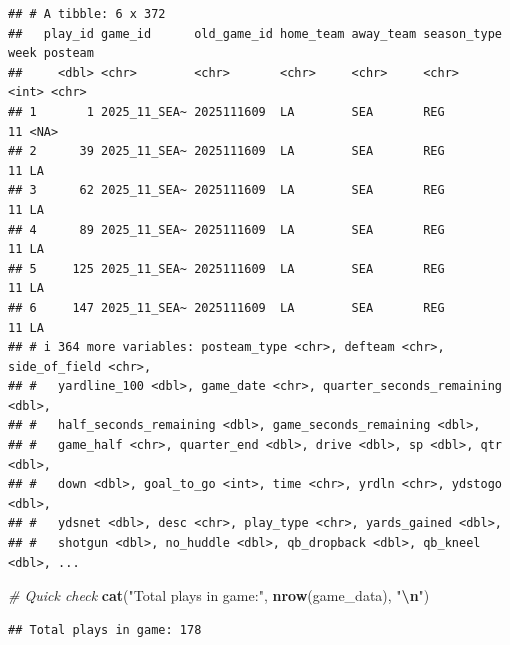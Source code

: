 \documentclass[
]{article}
\newenvironment{Shaded}{\begin{snugshade}}{\end{snugshade}}
\newcommand{\AttributeTok}[1]{\textcolor[rgb]{0.13,0.29,0.53}{#1}}
\newcommand{\CommentTok}[1]{\textcolor[rgb]{0.56,0.35,0.01}{\textit{#1}}}
\newcommand{\ConstantTok}[1]{\textcolor[rgb]{0.56,0.35,0.01}{#1}}
\newcommand{\FunctionTok}[1]{\textcolor[rgb]{0.13,0.29,0.53}{\textbf{#1}}}
\newcommand{\NormalTok}[1]{#1}
\newcommand{\SpecialCharTok}[1]{\textcolor[rgb]{0.81,0.36,0.00}{\textbf{#1}}}
\newcommand{\StringTok}[1]{\textcolor[rgb]{0.31,0.60,0.02}{#1}}
\begin{document}
\begin{verbatim}
## # A tibble: 6 x 372
##   play_id game_id      old_game_id home_team away_team season_type  week posteam
##     <dbl> <chr>        <chr>       <chr>     <chr>     <chr>       <int> <chr>  
## 1       1 2025_11_SEA~ 2025111609  LA        SEA       REG            11 <NA>   
## 2      39 2025_11_SEA~ 2025111609  LA        SEA       REG            11 LA     
## 3      62 2025_11_SEA~ 2025111609  LA        SEA       REG            11 LA     
## 4      89 2025_11_SEA~ 2025111609  LA        SEA       REG            11 LA     
## 5     125 2025_11_SEA~ 2025111609  LA        SEA       REG            11 LA     
## 6     147 2025_11_SEA~ 2025111609  LA        SEA       REG            11 LA     
## # i 364 more variables: posteam_type <chr>, defteam <chr>, side_of_field <chr>,
## #   yardline_100 <dbl>, game_date <chr>, quarter_seconds_remaining <dbl>,
## #   half_seconds_remaining <dbl>, game_seconds_remaining <dbl>,
## #   game_half <chr>, quarter_end <dbl>, drive <dbl>, sp <dbl>, qtr <dbl>,
## #   down <dbl>, goal_to_go <int>, time <chr>, yrdln <chr>, ydstogo <dbl>,
## #   ydsnet <dbl>, desc <chr>, play_type <chr>, yards_gained <dbl>,
## #   shotgun <dbl>, no_huddle <dbl>, qb_dropback <dbl>, qb_kneel <dbl>, ...
\end{verbatim}

\begin{Shaded}
\begin{Highlighting}[]
\CommentTok{\# Quick check}
\FunctionTok{cat}\NormalTok{(}\StringTok{"Total plays in game:"}\NormalTok{, }\FunctionTok{nrow}\NormalTok{(game\_data), }\StringTok{"}\SpecialCharTok{\textbackslash{}n}\StringTok{"}\NormalTok{)}
\end{Highlighting}
\end{Shaded}

\begin{verbatim}
## Total plays in game: 178
\end{verbatim}

\begin{Shaded}
\end{Shaded}
\end{document}

